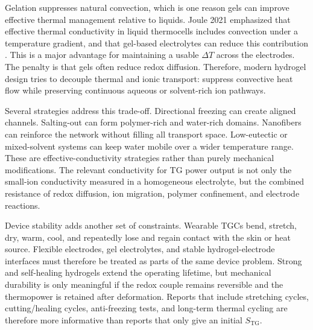 Gelation suppresses natural convection, which is one reason gels can improve
effective thermal management relative to liquids. Joule 2021 emphasized that
effective thermal conductivity in liquid thermocells includes convection under a
temperature gradient, and that gel-based electrolytes can reduce this
contribution \citep{duan2021liquid}. This is a major advantage for maintaining
a usable $\Delta T$ across the electrodes. The penalty is that gels often reduce
redox diffusion. Therefore, modern hydrogel design tries to decouple thermal
and ionic transport: suppress convective heat flow while preserving continuous
aqueous or solvent-rich ion pathways.

Several strategies address this trade-off. Directional freezing can create
aligned channels. Salting-out can form polymer-rich and water-rich domains.
Nanofibers can reinforce the network without filling all transport space.
Low-eutectic or mixed-solvent systems can keep water mobile over a wider
temperature range. These are effective-conductivity strategies rather than
purely mechanical modifications.
The relevant conductivity for TG power output is not
only the small-ion conductivity measured in a homogeneous electrolyte, but the
combined resistance of redox diffusion, ion migration, polymer confinement, and
electrode reactions.

Device stability adds another set of constraints. Wearable TGCs bend, stretch,
dry, warm, cool, and repeatedly lose and regain contact with the skin or heat
source. Flexible electrodes, gel electrolytes, and stable hydrogel-electrode
interfaces must therefore be treated as parts of the same device problem.
Strong and self-healing hydrogels
extend the operating lifetime, but mechanical durability is only meaningful if
the redox couple remains reversible and the thermopower is retained after
deformation. Reports that include stretching cycles, cutting/healing cycles,
anti-freezing tests, and long-term thermal cycling are therefore more
informative than reports that only give an initial $S_{\mathrm{TG}}$.


